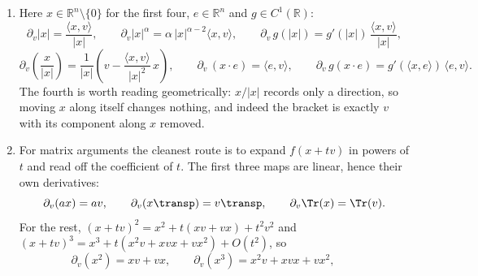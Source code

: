 \begin{exercisesolution}
\begin{enumerate}[label=\textbf{(\alph*)}]
\begin{itemize}
        $x_1^2 \leq x_1^2+x_2^2$ gives $|f| \leq |x_2|$. It is not differentiable there:
        \[\partial_vf(0) = \lim_{t\to0}\frac{f(tv)}{t}
          = \lim_{t\to0}\frac{t^3v_1^2v_2}{t^3(v_1^2+v_2^2)} = \frac{v_1^2v_2}{v_1^2+v_2^2},\]
        which exists in every direction and is \emph{not linear} in $v$.
      \item $\dfrac{x_1^2x_2}{x_1^2+x_2^4}$ also satisfies $|f| \leq |x_2|$, so it too extends
        continuously by $0$. Here
        \[\partial_vf(0) = \lim_{t\to0}\frac{t^3v_1^2v_2}{t^3\,(v_1^2 + t^2v_2^4)}
          = \begin{cases} v_2 & v_1 \neq 0,\\ 0 & v_1 = 0,\end{cases}\]
        which is not even continuous in $v$, let alone linear. Again continuous, not
        differentiable.
    \end{itemize}
    All three are instances of \cref{ex:all_directional_derivatives_exist}: every directional
    derivative can exist without the map $v \mapsto \partial_vf(0)$ being linear, and linearity
    is exactly what differentiability demands.
  \item Here $x \in \mathbb{R}^n\setminus\{0\}$ for the first four, $e \in \mathbb{R}^n$ and
    $g \in C^1(\mathbb{R})$:
    \[\partial_v|x| = \frac{\langle x,v\rangle}{|x|}, \qquad
      \partial_v|x|^\alpha = \alpha\,|x|^{\alpha-2}\langle x,v\rangle, \qquad
      \partial_v\,g(|x|) = g'(|x|)\,\frac{\langle x,v\rangle}{|x|},\]
    \[\partial_v\!\left(\frac{x}{|x|}\right)
        = \frac{1}{|x|}\left(v - \frac{\langle x,v\rangle}{|x|^2}\,x\right), \qquad
      \partial_v\,(x\cdot e) = \langle e,v\rangle, \qquad
      \partial_v\,g(x\cdot e) = g'(\langle x,e\rangle)\,\langle e,v\rangle.\]
    The fourth is worth reading geometrically: $x/|x|$ records only a direction, so moving $x$
    along itself changes nothing, and indeed the bracket is exactly $v$ with its component along
    $x$ removed.
  \item For matrix arguments the cleanest route is to expand
    $f(x+tv)$ in powers of $t$ and read off the coefficient of $t$. The first three maps are
    linear, hence their own derivatives:
    \[\partial_v(ax) = av, \qquad \partial_v(x\transp) = v\transp, \qquad
      \partial_v \Tr(x) = \Tr(v).\]
    For the rest, $(x+tv)^2 = x^2 + t(xv+vx) + t^2v^2$ and
    $(x+tv)^3 = x^3 + t(x^2v + xvx + vx^2) + O(t^2)$, so
    \[\partial_v(x^2) = xv + vx, \qquad \partial_v(x^3) = x^2v + xvx + vx^2, \qquad
\]
\end{enumerate}
\end{exercisesolution}
